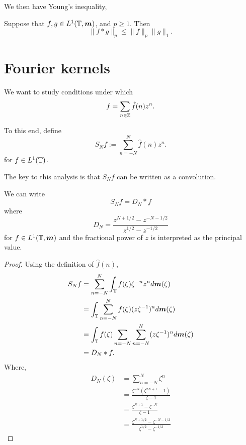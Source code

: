 \documentclass{owmaths}
\begin{document}
We then have Young's inequality,
\begin{proposition}
    Suppose that $f,g \in L^1(\mathbb{T},\boldsymbol{m})$, and $p \geq 1$. Then
    \begin{equation*}
        \|f*g\|_p \leq \|f\|_p\|g\|_1.
    \end{equation*}
\end{proposition}

\section{Fourier kernels}
We want to study conditions under which
\begin{equation*}
    f = \sum_{n \in \mathbb{Z}} \hat{f}(n) z^n.
\end{equation*}

To this end, define
\begin{equation*}
    S_N f := \sum_{n=-N}^N \hat{f}(n)z^n.
\end{equation*}
for $f \in L^1(\mathbb{T})$.

The key to this analysis is that $S_N f$ can be written as a convolution.
\begin{proposition}
    We can write
    \begin{equation*}
        S_N f = D_N * f
    \end{equation*}
    where 
    \begin{equation*}
        D_N = \frac{z^{N+1/2}-z^{-N-1/2}}{z^{1/2}-z^{-1/2}}
    \end{equation*}
    for $f \in L^1(\mathbb{T},\boldsymbol{m})$ and the fractional power of $z$ is interpreted
    as the principal value.
\end{proposition}
\begin{proof}
    Using the definition of $\hat{f}(n)$,
    \begin{align*}
        S_N f &= \sum_{n=-N}^N \int_{\mathbb{T}} f(\zeta)\zeta^{-n}z^nd\boldsymbol{m}(\zeta)\\
        &= \int_{\mathbb{T}} \sum_{n=-N}^N f(\zeta) (z\zeta^{-1})^n d\boldsymbol{m}(\zeta)\\
        &= \int_{\mathbb{T}} f(\zeta) \sum_{n=-N} \sum_{n=-N}^N (z\zeta^{-1})^n d\boldsymbol{m}(\zeta)\\
        &= D_N * f.
    \end{align*}
    Where,
    \begin{align*}
        D_N(\zeta) &= \sum_{n=-N}^N \zeta^n\\
        &= \frac{\zeta^{-N}(\zeta^{2N+1}-1)}{\zeta-1}\\
        &= \frac{\zeta^{N+1}-\zeta^{-N}}{\zeta-1}\\
        &= \frac{\zeta^{N+1/2}-\zeta^{-N-1/2}}{\zeta^{1/2}-\zeta^{-1/2}}
    \end{align*}
\end{proof}
\end{document}
